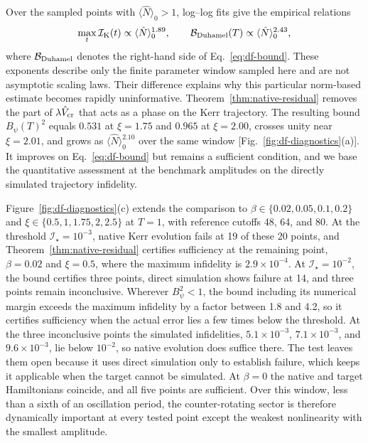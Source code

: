 \documentclass[pra,twocolumn,superscriptaddress,nofootinbib,floatfix]{revtex4-2}
\theoremstyle{remark}
\begin{document}
Over the sampled points with \(\langle\hat N\rangle_0>1\), log--log fits give the empirical relations
\begin{align}
\max_t\mathcal I_{\rm K}(t)\propto\langle\hat N\rangle_0^{1.89},\qquad\mathcal B_{\rm Duhamel}(T)\propto\langle\hat N\rangle_0^{2.43},
\end{align}
where \(\mathcal B_{\rm Duhamel}\) denotes the right-hand side of Eq.~\eqref{eq:df-bound}. These exponents describe only the finite parameter window sampled here and are not asymptotic scaling laws. Their difference explains why this particular norm-based estimate becomes rapidly uninformative. Theorem~\ref{thm:native-residual} removes the part of \(\lambda\hat V_{\rm cr}\) that acts as a phase on the Kerr trajectory. The resulting bound \(B_\psi(T)^2\) equals \(0.531\) at \(\xi=1.75\) and \(0.965\) at \(\xi=2.00\), crosses unity near \(\xi=2.01\), and grows as \(\langle\hat N\rangle_0^{2.10}\) over the same window [Fig.~\ref{fig:df-diagnostics}(a)]. It improves on Eq.~\eqref{eq:df-bound} but remains a sufficient condition, and we base the quantitative assessment at the benchmark amplitudes on the directly simulated trajectory infidelity.

Figure~\ref{fig:df-diagnostics}(c) extends the comparison to \(\beta\in\{0.02,0.05,0.1,0.2\}\) and \(\xi\in\{0.5,1,1.75,2,2.5\}\) at \(T=1\), with reference cutoffs 48, 64, and 80. At the threshold \(\mathcal I_\star=10^{-3}\), native Kerr evolution fails at 19 of these 20 points, and Theorem~\ref{thm:native-residual} certifies sufficiency at the remaining point, \(\beta=0.02\) and \(\xi=0.5\), where the maximum infidelity is \(2.9\times10^{-4}\). At \(\mathcal I_\star=10^{-2}\), the bound certifies three points, direct simulation shows failure at 14, and three points remain inconclusive. Wherever \(B_\psi^2<1\), the bound including its numerical margin exceeds the maximum infidelity by a factor between 1.8 and 4.2, so it certifies sufficiency when the actual error lies a few times below the threshold. At the three inconclusive points the simulated infidelities, \(5.1\times10^{-3}\), \(7.1\times10^{-3}\), and \(9.6\times10^{-3}\), lie below \(10^{-2}\), so native evolution does suffice there. The test leaves them open because it uses direct simulation only to establish failure, which keeps it applicable when the target cannot be simulated. At \(\beta=0\) the native and target Hamiltonians coincide, and all five points are sufficient. Over this window, less than a sixth of an oscillation period, the counter-rotating sector is therefore dynamically important at every tested point except the weakest nonlinearity with the smallest amplitude.
\end{document}
